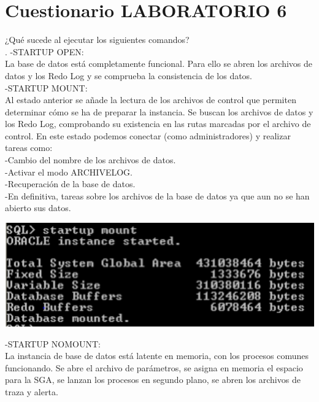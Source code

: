 \section{Cuestionario LABORATORIO 6} 
	\item ¿Qué sucede al ejecutar los siguientes comandos?\\.
	  -STARTUP OPEN:\\
    La base de datos está completamente funcional. Para ello se abren los archivos de datos y los Redo Log y se comprueba la consistencia de los datos.\\
    
    -STARTUP MOUNT:\\
    Al estado anterior se añade la lectura de los archivos de control que permiten determinar cómo se ha de preparar la instancia. 
    Se buscan los archivos de datos y los Redo Log, comprobando su existencia en las rutas marcadas por el archivo de control.
    En este estado podemos conectar (como administradores) y realizar tareas como:\\
      -Cambio del nombre de los archivos de datos.\\
      -Activar el modo ARCHIVELOG.\\
      -Recuperación de la base de datos.\\
      -En definitiva, tareas sobre los archivos de la base de datos ya que aun no se han abierto sus datos.\\
      
	\begin{center}
	\includegraphics[width=14cm]{./Imagenes/imagen62} 
	\end{center}
  
    -STARTUP NOMOUNT:\\
    La instancia de base de datos está latente en memoria, con los procesos comunes funcionando. 
    Se abre el archivo de parámetros, se asigna en memoria el espacio para la SGA, 
    se lanzan los procesos en segundo plano, se abren los archivos de traza y alerta.\\
    
